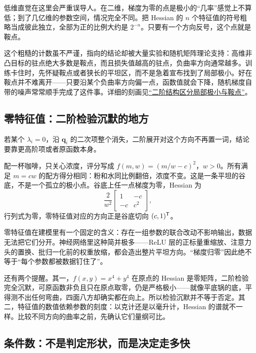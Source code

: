 低维直觉在这里会严重误导人。在二维，梯度为零的点是极小的``几率''感觉上不算低；到了几亿维的参数空间，情况完全不同。把 Hessian 的 \(n\) 个特征值的符号粗略当成彼此独立，全部为正的比例大约是 \(2^{-n}\)。只要有一个方向反号，这个点就是鞍点。

这个粗糙的计数虽不严谨，指向的结论却被大量实验和随机矩阵理论支持：高维非凸目标的驻点绝大多数是鞍点，而且损失值越高的驻点，负曲率方向通常越多。训练卡住时，先怀疑鞍点或者狭长的平坦区，而不是急着宣布找到了局部极小。好在鞍点并不难离开——只要沿某个负曲率方向偏一点，函数值就会下降，随机梯度自带的噪声常常顺手完成了这件事。详细的刻画见\hyperref[sec:09-Convex-Optimization/08-Nonconvex-and-Stochastic-Optimization/02]{``二阶结构区分局部极小与鞍点''}。

\subsection{零特征值：二阶检验沉默的地方}

若某个 \(\lambda_i=0\)，沿 \(\mathbf q_i\) 的二次项整个消失，二阶展开对这个方向不再置一词，结论要靠更高阶项或者原函数本身。

\begin{example}
配一杯咖啡，只关心浓度，评分写成 \(f(m,w)=(m/w-c)^2\)，\(w>0\)。所有满足 \(m=cw\) 的配方得分相同：粉和水同比例翻倍，浓度不变。这是一条平坦的谷底，不是一个孤立的极小点。谷底上任一点梯度为零，Hessian 为
\[
\frac{2}{w^2}\begin{bmatrix}1&-c\\-c&c^2\end{bmatrix},
\]
行列式为零，零特征值对应的方向正是谷底切向 \((c,1)^{\mathsf{T}}\)。
\end{example}

零特征值在建模里有一个固定的含义：存在一组参数的联合改动不影响输出，数据无法把它们分开。神经网络里这种简并极多——ReLU 层的正标量重缩放、注意力头的置换、批归一化前的权重放缩，都会造出整片平坦方向。``梯度归零''因此绝不等于``每个参数都被数据钉住了''。

还有两个提醒。其一，\(f(x,y)=x^4+y^4\) 在原点的 Hessian 是零矩阵，二阶检验完全沉默，可原函数非负且只在原点取零，仍是严格极小——就像平底锅的底，平得测不出任何弯曲，四面八方却确实都在向上。所以检验沉默并不等于否定。其二，特征值的数值依赖参数的刻度：以克计还是以毫升计，Hessian 的谱就不一样。比较不同方向的曲率之前，先确认它们量纲可比。

\subsection{条件数：不是判定形状，而是决定走多快}

